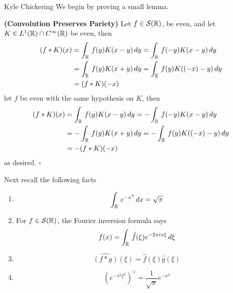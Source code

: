 

\begin{solution}{Kyle Chickering}
        We begin by proving a small lemma.

        \textbf{(Convolution Preserves Pariety)} 
        Let $f\in \mathcal{S}(\mathbb{R})$, be even, and let $K\in L^1(\mathbb{R})\cap C^\infty(\mathbb{R})$ be even, then
        \begin{align*}
        (f*K)(x) &= \int_{\mathbb{R}}\,f(y)K(x-y)\,dy = \int_{\mathbb{R}}\,f(-y)K(x-y)\,dy \\
             &= \int_{\mathbb{R}}\,f(y)K(x+y)\,dy =\int_{\mathbb{R}}\,f(y)K((-x)-y)\,dy \\
             &=(f*K)(-x)
        \end{align*}
        let $f$ be even with the same hypothesis on $K$, then
        \begin{align*}
        (f*K)(x) &= \int_{\mathbb{R}}\,f(y)K(x-y)\,dy =
               -\int_{\mathbb{R}}\,f(-y)K(x-y)\,dy \\
             &= -\int_{\mathbb{R}}\,f(y)K(x+y)\,dy =
               -\int_{\mathbb{R}}\,f(y)K((-x)-y)\,dy \\
             &=-(f*K)(-x)
        \end{align*}
        as desired. $\square$

        Next recall the following facts
        \begin{enumerate}[label=(\roman*)]
                \item
                        \[ \int_{\mathbb{R}}\,e^{-x^2}\,dx = \sqrt{\pi} \]

                \item 
                        For $f\in \mathcal{S}(\mathbb{R})$, the Fourier inversion formula says
                        \[ f(x) = \int_{\mathbb{R}}\,\hat{f}(\xi)e^{-2\pi i x \xi}\,d\xi  \]

                \item
                        \[ \widehat{(f*g)}(\xi) = \hat{f}(\xi)\hat{g}(\xi) \]

                \item
                        \[ (e^{-\pi^2\xi^2})^{\vee}=\frac{1}{\sqrt{\pi}}e^{-x^2} \]
        \end{enumerate}


\end{solution}
